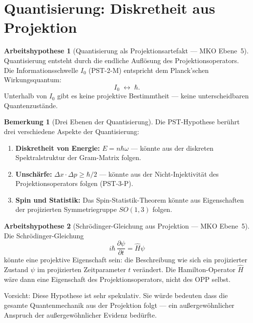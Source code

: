 \documentclass[11pt,a4paper]{article}
\theoremstyle{plain}
\theoremstyle{definition}
\newtheorem{remark}{Bemerkung}[section]
\newtheorem{hypothese}{Arbeitshypothese}[section]
\begin{document}
\section{Quantisierung: Diskretheit aus Projektion}

\begin{hypothese}[Quantisierung als Projektionsartefakt --- MKO Ebene~5]
Quantisierung entsteht durch die endliche Aufl\"{o}sung des
Projektionsoperators. Die Informationsschwelle $I_0$ (PST-2-M)
entspricht dem Planck'schen Wirkungsquantum:
\[
  I_0 \;\leftrightarrow\; \hbar.
\]
Unterhalb von $I_0$ gibt es keine projektive Bestimmtheit ---
keine unterscheidbaren Quantenzust\"{a}nde.
\end{hypothese}

\begin{remark}[Drei Ebenen der Quantisierung]
Die PST-Hypothese ber\"{u}hrt drei verschiedene Aspekte der Quantisierung:
\begin{enumerate}
  \item \textbf{Diskretheit von Energie:} $E = n\hbar\omega$ ---
        k\"{o}nnte aus der diskreten Spektralstruktur der Gram-Matrix folgen.
  \item \textbf{Unsch\"{a}rfe:} $\Delta x \cdot \Delta p \geq \hbar/2$
        --- k\"{o}nnte aus der Nicht-Injektivit\"{a}t des Projektionsoperators
        folgen (PST-3-P).
  \item \textbf{Spin und Statistik:} Das Spin-Statistik-Theorem k\"{o}nnte
        aus Eigenschaften der projizierten Symmetriegruppe $SO(1,3)$ folgen.
\end{enumerate}
\end{remark}

\begin{hypothese}[Schr\"{o}dinger-Gleichung aus Projektion --- MKO Ebene~5]
Die Schr\"{o}dinger-Gleichung
\[
  i\hbar\, \frac{\partial\psi}{\partial t} = \hat{H}\psi
\]
k\"{o}nnte eine projektive Eigenschaft sein: die Beschreibung wie sich
ein projizierter Zustand $\psi$ im projizierten Zeitparameter $t$
ver\"{a}ndert. Die Hamilton-Operator $\hat{H}$ w\"{a}re dann eine
Eigenschaft des Projektionsoperators, nicht des OPP selbst.

Vorsicht: Diese Hypothese ist sehr spekulativ. Sie w\"{u}rde bedeuten dass
die gesamte Quantenmechanik aus der Projektion folgt --- ein
au\ss{}ergew\"{o}hnlicher Anspruch der au\ss{}ergew\"{o}hnlicher Evidenz
bed\"{u}rfte.
\end{hypothese}
\end{document}
